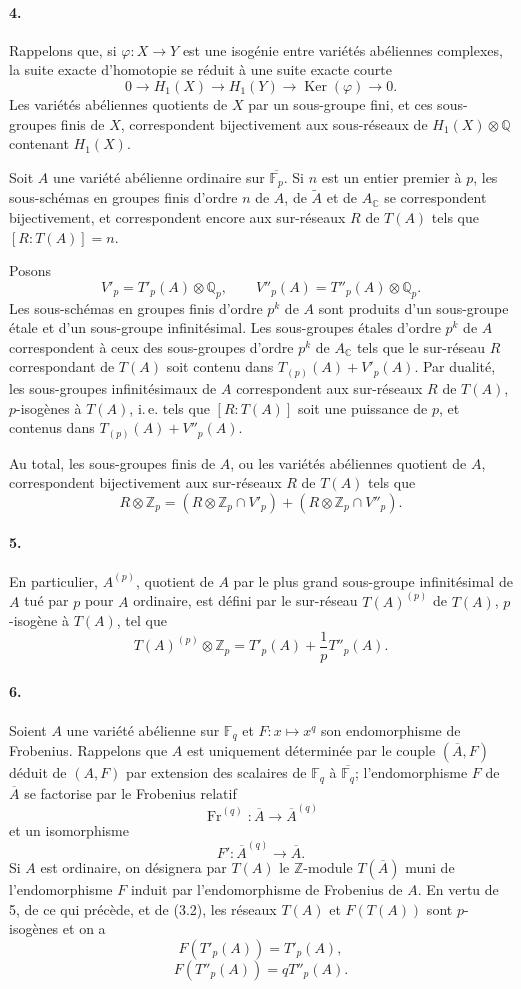 \documentclass[10pt]{article}
\newcommand{\C}{\mathbb C}
\newcommand{\Fp}{\mathbb F_p}
\newcommand{\Fq}{\mathbb F_q}
\newcommand{\Q}{\mathbb Q}
\newcommand{\Z}{\mathbb Z}
\newcommand{\Ac}{A_{\C}}
\newcommand{\Ker}{\operatorname{Ker}}
\newcommand{\Fr}{\operatorname{Fr}}
\begin{document}
\paragraph{4.} Rappelons que, si $\varphi:X\to Y$ est une isogénie entre variétés abéliennes complexes, la suite exacte d'homotopie se réduit à une suite exacte courte
\[
0\longrightarrow H_1(X)\longrightarrow H_1(Y)\longrightarrow\Ker(\varphi)\longrightarrow0.
\]
Les variétés abéliennes quotients de $X$ par un sous-groupe fini, et ces sous-groupes finis de $X$, correspondent bijectivement aux sous-réseaux de $H_1(X)\otimes\Q$ contenant $H_1(X)$.

Soit $A$ une variété abélienne ordinaire sur $\overline{\Fp}$. Si $n$ est un entier premier à $p$, les sous-schémas en groupes finis d'ordre $n$ de $A$, de $\widetilde A$ et de $\Ac$ se correspondent bijectivement, et correspondent encore aux sur-réseaux $R$ de $T(A)$ tels que $[R:T(A)]=n$.

Posons
\[
V'_p=T'_p(A)\otimes\Q_p,\qquad V''_p(A)=T''_p(A)\otimes\Q_p.
\]
Les sous-schémas en groupes finis d'ordre $p^k$ de $A$ sont produits d'un sous-groupe étale et d'un sous-groupe infinitésimal. Les sous-groupes étales d'ordre $p^k$ de $A$ correspondent à ceux des sous-groupes d'ordre $p^k$ de $\Ac$ tels que le sur-réseau $R$ correspondant de $T(A)$ soit contenu dans $T_{(p)}(A)+V'_p(A)$. Par dualité, les sous-groupes infinitésimaux de $A$ correspondent aux sur-réseaux $R$ de $T(A)$, $p$-isogènes à $T(A)$, i.\,e. tels que $[R:T(A)]$ soit une puissance de $p$, et contenus dans $T_{(p)}(A)+V''_p(A)$.

Au total, les sous-groupes finis de $A$, ou les variétés abéliennes quotient de $A$, correspondent bijectivement aux sur-réseaux $R$ de $T(A)$ tels que
\[
\tag{4.1}
R\otimes\Z_p=(R\otimes\Z_p\cap V'_p)+(R\otimes\Z_p\cap V''_p).
\]

\paragraph{5.} En particulier, $A^{(p)}$, quotient de $A$ par le plus grand sous-groupe infinitésimal de $A$ tué par $p$ pour $A$ ordinaire, est défini par le sur-réseau $T(A)^{(p)}$ de $T(A)$, $p$-isogène à $T(A)$, tel que
\[
T(A)^{(p)}\otimes\Z_p=T'_p(A)+\frac{1}{p}T''_p(A).
\]

\paragraph{6.} Soient $A$ une variété abélienne sur $\Fq$ et $F:x\mapsto x^q$ son endomorphisme de Frobenius. Rappelons que $A$ est uniquement déterminée par le couple $(\overline A,F)$ déduit de $(A,F)$ par extension des scalaires de $\Fq$ à $\overline{\Fq}$; l'endomorphisme $F$ de $\overline A$ se factorise par le Frobenius relatif
\[
\Fr^{(q)}:\overline A\longrightarrow \overline A^{(q)}
\]
et un isomorphisme
\[
F':\overline A^{(q)}\longrightarrow\overline A.
\]
Si $A$ est ordinaire, on désignera par $T(A)$ le $\Z$-module $T(\overline A)$ muni de l'endomorphisme $F$ induit par l'endomorphisme de Frobenius de $A$. En vertu de 5, de ce qui précède, et de (3.2), les réseaux $T(A)$ et $F(T(A))$ sont $p$-isogènes et on a
\[
\tag{6.1}
F(T'_p(A))=T'_p(A),
\]
\[
\tag{6.2}
F(T''_p(A))=qT''_p(A).
\]
\end{document}
